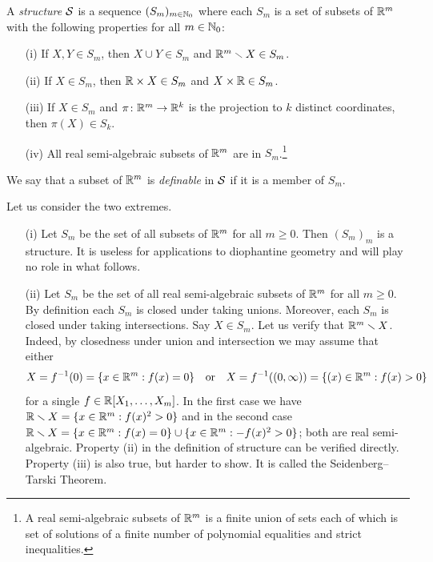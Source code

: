 \begin{definition}
  \label{def:structure}
  A \emph{structure} ${\mathcal S}$ is a sequence $(S_m)_{m\in{\mathbb{N}}_0}$
  where each $S_m$ is a set of subsets of ${\mathbb{R}}^m$ with the following
  properties for all $m\in {\mathbb{N}}_0$:
  \begin{enumerate}
  \item [(i)] If $X,Y\in S_m$, then $X\cup Y\in S_m$ and
    ${\mathbb{R}}^m\smallsetminus X\in S_m$.
  \item[(ii)] If $X\in S_m$, then ${\mathbb{R}}\times X\in S_m$ and $X\times
    {\mathbb{R}}\in S_m$.
  \item[(iii)] If $X\in S_{m}$ and $\pi\colon
    {\mathbb{R}}^{m}\rightarrow{\mathbb{R}}^k$ is the projection to $k$ distinct
    coordinates, then 
    $\pi(X)\in S_k$.
  \item[(iv)] All real semi-algebraic subsets of ${\mathbb{R}}^m$ are in
    $S_m$.\footnote{A real semi-algebraic subsets of ${\mathbb{R}}^m$ is a
      finite union of sets each of which is set of 
      solutions of a finite number of polynomial equalities and
      strict inequalities.}    
  \end{enumerate}
  We say that a subset of  ${\mathbb{R}}^m$ is \emph{definable} in ${\mathcal S}$ if it
  is a member of $S_m$.
\end{definition}

\begin{example} Let us consider the two extremes.
  \begin{enumerate}
  \item [(i)] Let $S_m$  be the set of all subsets of ${\mathbb{R}}^m$ for
    all $m\ge 0$. Then $(S_m)_m$ is a structure. It is useless for
    applications to diophantine geometry 
    and will play no role
    in what follows.
  \item[(ii)]
    Let $S_m$  be the set of all real semi-algebraic subsets of ${\mathbb{R}}^m$
    for all $m\ge 0$. By definition each $S_m$ is closed under taking
    unions. Moreover, each $S_m$ is closed under taking intersections.    
    Say $X\in S_m$. Let us  verify that ${\mathbb{R}}^m \smallsetminus X$. Indeed, by
    closedness under union and intersection we may assume that either 
    \begin{equation*}
      X = f^{-1}(0)=\{ x\in{\mathbb{R}}^m : f(x) = 0\}
      \quad\text{or}\quad       X = f^{-1}((0,\infty))=\{ (x)\in{\mathbb{R}}^m : f(x) > 0\}
    \end{equation*}
    for a single $f\in{\mathbb{R}}[X_1,\ldots,X_m]$. In the first case
    we have ${\mathbb{R}}\smallsetminus X=\{x\in{\mathbb{R}}^m : f(x)^2 > 0\}$ and in the second
    case
    ${\mathbb{R}}\smallsetminus X = \{x\in{\mathbb{R}}^m : f(x)=0\} \cup \{x\in {\mathbb{R}}^m: -f(x)^2 >
    0\}$; both are real semi-algebraic.
    Property (ii) in the definition of structure can be verified
    directly. Property (iii) is also true, but harder to show. It
    is called the Seidenberg--Tarski Theorem.
  \end{enumerate}
\end{example}



